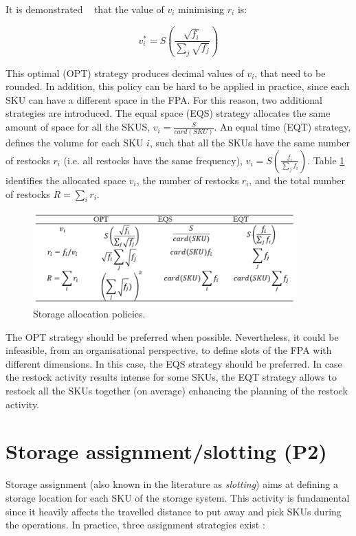 It is demonstrated ~\cite{Bartholdi2017} that the value of $v_i$ minimising $r_i$ is:

\begin{equation}
    v_i^\ast=S\left(\frac{\sqrt{f_i}}{\sum_{j}\sqrt{f_j}}\right)
\end{equation}

This optimal (OPT) strategy produces decimal values of $v_i$, that need to be rounded. In addition, this policy can be hard to be applied in practice, since each SKU can have a different space in the FPA. For this reason, two additional strategies are introduced. The equal space (EQS)  strategy allocates the same amount of space for all the SKUS, $v_i=\frac{S}{card\left(SKU\right)}$. An equal time (EQT) strategy, defines the volume for each SKU $i$, such that all the SKUs have the same number of restocks $r_i$ (i.e. all restocks have the same frequency), $v_i=S\left(\frac{f_i}{\sum_{j} f_i}\right)$. Table \ref{tab_allocation} identifies the allocated space $v_i$, the number of restocks $r_i$, and the total number of restocks $R=\sum_{i} r_i$.

\begin{figure}[hbt!]
\centering
\includegraphics[width=0.9\textwidth]{SectionWarehouses/design_figures/tab_allocation.png}
\captionsetup{type=table}
\caption{Storage allocation policies.}
\label{tab_allocation}
\end{figure}

The OPT strategy should be preferred when possible. Nevertheless, it could be infeasible, from an organisational perspective, to define slots of the FPA with different dimensions. In this case, the EQS strategy should be preferred. In case the restock activity results intense for some SKUs, the EQT strategy allows to restock all the SKUs together (on average) enhancing the planning of the restock activity.

\section{Storage assignment/slotting (P2)} \label{secWhAssignment}
Storage assignment (also known in the literature as \textit{slotting}) aims at defining a storage location for each SKU of the storage system. This activity is fundamental since it heavily affects the travelled distance to put away and pick SKUs during the operations. In practice, three assignment strategies exist \cite{Accorsi2017_stockSafety, Ang2012, Battini2015, Bortolini2015, Cardona2016, Chen2011, Fontana2014, Goetschalckx1990, Guerriero2013, Guo2016, Jarvis1991, Kallina1976, Larson1997, Le-Duc1999, Mallette1972, Malmborg1989, Manzini2015b, MuppaniMuppant2008, Pan2015, Quintanilla2015, Sooksaksun2012, Xie2014}:

